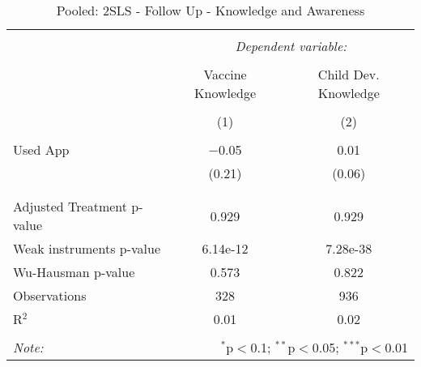 
\begin{table}[!htbp] \centering 
  \caption{Pooled: 2SLS - Follow Up - Knowledge and Awareness} 
  \label{tbl:Pooled: 2SLS - Follow Up - Knowledge and Awareness} 
\begin{tabular}{@{\extracolsep{5pt}}lcc} 
\\[-1.8ex]\hline 
\hline \\[-1.8ex] 
 & \multicolumn{2}{c}{\textit{Dependent variable:}} \\ 
\cline{2-3} 
\\[-1.8ex] & Vaccine Knowledge & Child Dev. Knowledge \\ 
\\[-1.8ex] & (1) & (2)\\ 
\hline \\[-1.8ex] 
 Used App & $-$0.05 & 0.01 \\ 
  & (0.21) & (0.06) \\ 
  & & \\ 
\hline \\[-1.8ex] 
Adjusted Treatment p-value & 0.929 & 0.929 \\ 
Weak instruments p-value & 6.14e-12 & 7.28e-38 \\ 
Wu-Hausman p-value & 0.573 & 0.822 \\ 
Observations & 328 & 936 \\ 
R$^{2}$ & 0.01 & 0.02 \\ 
\hline 
\hline \\[-1.8ex] 
\textit{Note:}  & \multicolumn{2}{r}{$^{*}$p$<$0.1; $^{**}$p$<$0.05; $^{***}$p$<$0.01} \\ 
\end{tabular} 
\end{table} 
